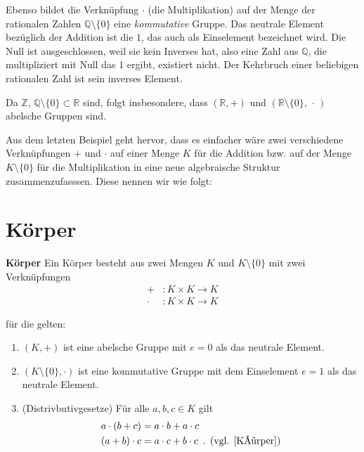 \theoremstyle{example}
\begin{example}{}
Ebenso bildet die Verknüpfung $\cdot$ (die Multiplikation) auf der Menge der rationalen Zahlen $\mathbb{Q}\setminus\{0\}$  eine \emph{kommutative} Gruppe. Das neutrale Element bezüglich der Addition ist die $1$, das auch als {\glqq}Einselement{\grqq} \cite[S.  20, 4.1]{Skript} bezeichnet wird. Die Null ist ausgeschlossen, weil sie kein Inverses hat, also eine Zahl aus $\mathbb{Q}$, die multipliziert mit Null das $1$ ergibt, existiert nicht. Der Kehrbruch einer beliebigen rationalen Zahl ist sein inverses Element.
\end{example}

\theoremstyle{example}
\begin{example}{}
Da $\mathbb{Z}, \, \mathbb{Q}\setminus\{0\} \subset \mathbb{R}$ sind, folgt insbesondere, dass $(\mathbb{R},+)$ und $(\mathbb{R}\setminus\{0\}, \, \cdot \,)$ abelsche Gruppen sind. 
\end{example}

Aus dem letzten Beispiel geht hervor, dass es einfacher wäre zwei verschiedene Verknüpfungen  $+$ und $\cdot$ auf einer Menge $K$ für die Addition bzw. auf der Menge $K\setminus\{0\}$ für die Multiplikation in eine  neue algebraische Struktur zusammenzufasssen. Diese nennen wir wie folgt:

\section{Körper}
\label{sec:Körper}
\theoremstyle{defintion}
\begin{definition}{\textbf{Körper}}
\label{Koerper}
Ein Körper besteht aus zwei Mengen $K$ und $K\setminus\{0\}$ mit zwei Verknüpfungen
\begin{align*}
	+&: K \times K \rightarrow K
	\\ \cdot &: K \times K \rightarrow K
\end{align*}

für die gelten:
\begin{enumerate}
\item $(K,+)$ ist eine abelsche Gruppe mit $e=0$ als das neutrale Element.
\item $(K\setminus\{0\}, \cdot)$ ist eine kommutative Gruppe mit dem Einselement $e=1$ als das neutrale Element.
\item(Distrivbutivgesetze)
Für alle $a, b, c \in K$ gilt
\begin{align*}
a \cdot (b+c)  &= a \cdot b + a \cdot c
\\ (a+b) \cdot c &= a\cdot c + b \cdot c \text{\, . (vgl. \cite{Körper})}
\end{align*}
\end{enumerate}
\end{definition}

